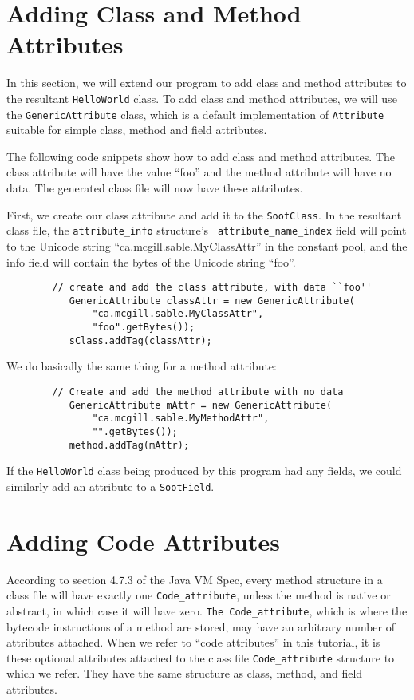 \documentclass{article}
\begin{document}
\section{Adding Class and Method Attributes}

In this section, we will extend our program to add class and method attributes 
to the resultant {\tt HelloWorld} class. To add class and method attributes, 
we will use the {\tt GenericAttribute} class, which is a default 
implementation of {\tt Attribute} suitable for simple class, method and field 
attributes.

The following code snippets show how to add class and method attributes. The 
class attribute will have the value ``foo'' and the method attribute will have 
no data. The generated class file will now have these attributes.

First, we create our class attribute and add it to the {\tt SootClass}. In the 
resultant class file, the {\tt attribute\_info} structure's {\tt 
attribute\_name\_index} field will point to the Unicode string 
``ca.\-mcgill\-.sable\-.My\-Class\-Attr'' in the constant pool, and the info 
field will contain the bytes of the Unicode string ``foo''.

\begin{verbatim}
        // create and add the class attribute, with data ``foo''
           GenericAttribute classAttr = new GenericAttribute(
               "ca.mcgill.sable.MyClassAttr",
               "foo".getBytes());
           sClass.addTag(classAttr);
\end{verbatim}

We do basically the same thing for a method attribute:

\begin{verbatim}
        // Create and add the method attribute with no data
           GenericAttribute mAttr = new GenericAttribute(
               "ca.mcgill.sable.MyMethodAttr",
               "".getBytes());
           method.addTag(mAttr);
\end{verbatim}

If the {\tt HelloWorld} class being produced by this program had any fields, 
we could similarly add an attribute to a {\tt SootField}.

\section{Adding Code Attributes}

According to section 4.7.3 of the Java VM Spec, every method structure in a 
class file will have exactly one {\tt Code\_attribute}, unless the method is 
native or abstract, in which case it will have zero. {\tt The 
Code\_attribute}, which is where the bytecode instructions of a method are 
stored, may have an arbitrary number of attributes attached. When we refer to 
``code attributes'' in this tutorial, it is these optional attributes attached 
to the class file {\tt Code\_attribute} structure to which we refer. They have 
the same structure as class, method, and field attributes.
\end{document}
